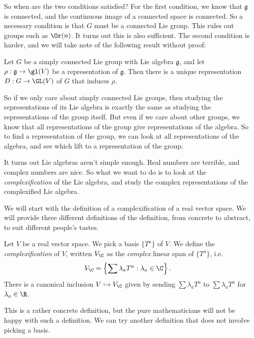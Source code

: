 \documentclass[a4paper]{article}
\begin{document}
So when are the two conditions satisfied? For the first condition, we know that $\mathfrak{g}$ is connected, and the continuous image of a connected space is connected. So a necessary condition is that $G$ must be a connected Lie group. This rules out groups such as $\Or(n)$. It turns out this is also sufficient. The second condition is harder, and we will take note of the following result without proof:
\begin{thm}
  Let $G$ be a simply connected Lie group with Lie algebra $\mathfrak{g}$, and let $\rho: \mathfrak{g} \to \gl(V)$ be a representation of $\mathfrak{g}$. Then there is a unique representation $D: G \to \GL(V)$ of $G$ that induces $\rho$.
\end{thm}
So if we only care about simply connected Lie groups, then studying the representations of its Lie algebra is exactly the same as studying the representations of the group itself. But even if we care about other groups, we know that all representations of the group give representations of the algebra. So to find a representation of the group, we can look at all representations of the algebra, and see which lift to a representation of the group.

It turns out Lie algebras aren't simple enough. Real numbers are terrible, and complex numbers are nice. So what we want to do is to look at the \emph{complexification} of the Lie algebra, and study the complex representations of the complexified Lie algebra.

We will start with the definition of a complexification of a real vector space. We will provide three different definitions of the definition, from concrete to abstract, to suit different people's tastes.

\begin{defi}[Complexification I]
  Let $V$ be a real vector space. We pick a basis $\{T^a\}$ of $V$. We define the \emph{complexification} of $V$, written $V_\C$ as the \emph{complex} linear span of $\{T^a\}$, i.e.
  \[
    V_\C = \left\{\sum \lambda_a T^a: \lambda_a \in \C\right\}.
  \]
  There is a canonical inclusion $V \hookrightarrow V_\C$ given by sending $\sum \lambda_a T^a$ to $\sum \lambda_a T^a$ for $\lambda_a \in \R$.
\end{defi}

This is a rather concrete definition, but the pure mathematicians will not be happy with such a definition. We can try another definition that does not involve picking a basis.
\end{document}
